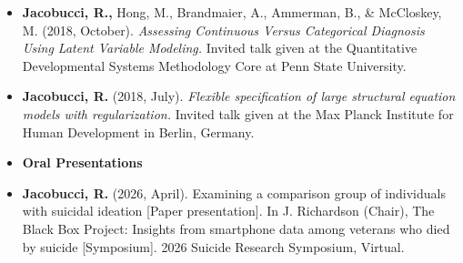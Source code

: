 \documentclass[letterpaper,10pt]{article}
\begin{document}
\begin{itemize}
	\item[]\textbf{Jacobucci, R.,} Hong, M., Brandmaier, A., Ammerman, B., \& McCloskey, M. (2018, October). \emph{Assessing Continuous Versus Categorical Diagnosis Using Latent Variable Modeling.} Invited talk given at the Quantitative Developmental Systems Methodology Core at Penn State University.
	\item[]\textbf{Jacobucci, R.} (2018, July). \emph{Flexible specification of large structural equation models with regularization.} Invited talk given at the Max Planck Institute for Human Development in Berlin, Germany.
	\item {\textbf{\large{Oral Presentations}}}
	
	\item[] \textbf{Jacobucci, R.} (2026, April). Examining a comparison group of individuals with suicidal ideation [Paper presentation]. In J. Richardson (Chair), The Black Box Project: Insights from smartphone data among veterans who died by suicide [Symposium]. 2026 Suicide Research Symposium, Virtual.
	

\end{itemize}
\end{document}
